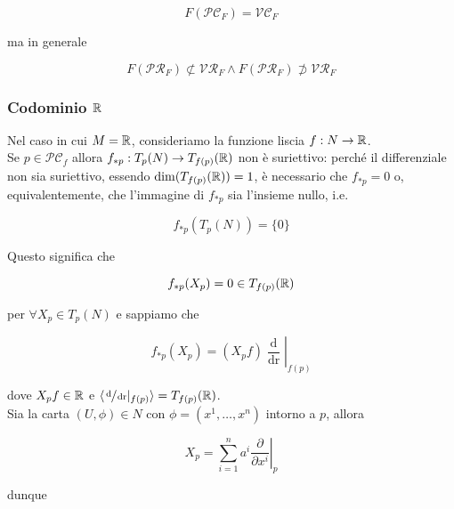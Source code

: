 \begin{remark}
	\begin{equation}
		F(\mathcal{PC}_{F}) = \mathcal{VC}_{F}
	\end{equation}

	ma in generale
	
	\begin{equation}
		F(\mathcal{PR}_{F}) \not\subset \mathcal{VR}_{F} \wedge F(\mathcal{PR}_{F}) \not\supset \mathcal{VR}_{F}
	\end{equation}
\end{remark}

\subsubsection{Codominio $ \mathbb{R} $}

Nel caso in cui $ M = \mathbb{R} $, consideriamo la funzione liscia $ f : N \to \mathbb{R} $.\\
Se $ p \in \mathcal{PC}_{f} $ allora $ f_{*p} : T_{p}(N) \to T_{f(p)}(\mathbb{R}) $ non è suriettivo: perché il differenziale non sia suriettivo, essendo $ \dim(T_{f(p)}(\mathbb{R})) = 1 $, è necessario che $ f_{*p} = 0 $ o, equivalentemente, che l'immagine di $ f_{*p} $ sia l'insieme nullo, i.e.

\begin{equation}
	f_{*p}(T_{p}(N)) = \{0\}
\end{equation}

Questo significa che

\begin{equation}
	f_{*p}(X_{p}) = 0 \in T_{f(p)}(\mathbb{R})
\end{equation}

per $ \forall X_{p} \in T_{p}(N) $ e sappiamo che

\begin{equation}
	f_{*p}(X_{p}) = (X_{p} f) \left. \dfrac{\operatorname{d}}{\operatorname{dr}} \right|_{f(p)}
\end{equation}

dove $ X_{p} f \in \mathbb{R} $ e $ \langle \sfrac{\operatorname{d}}{\operatorname{dr}} |_{f(p)} \rangle = T_{f(p)}(\mathbb{R}) $.\\
Sia la carta $ (U,\phi) \in N $ con $ \phi = (x^{1},\dots,x^{n}) $ intorno a $ p $, allora

\begin{equation}
	X_{p} = \sum_{i=1}^{n} a^{i} \left. \dfrac{\partial}{\partial x^{i}} \right|_{p}
\end{equation}

dunque

